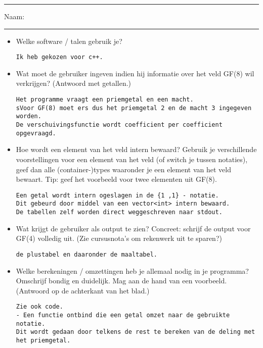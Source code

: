 \documentclass[11pt]{article}
\begin{document}
\begin{center}
\vspace{-4mm}{Discr Wisk \hfill\bf Eindige velden: vorderingen programmeeroefening \hfill 20 febr 2014}
\end{center}
\hrule
Naam: \\\phantom{x}
\hrule

\begin{itemize}
\item Welke software / talen gebruik je?
\begin{Verbatim}[frame=single]
Ik heb gekozen voor c++.
\end{Verbatim}

\item Wat moet de gebruiker ingeven indien hij informatie over het veld GF(8) wil verkrijgen? (Antwoord met getallen.)
\begin{Verbatim}[frame=single]
Het programme vraagt een priemgetal en een macht. 
sVoor GF(8) moet ers dus het priemgetal 2 en de macht 3 ingegeven worden.
De verschuivingsfunctie wordt coefficient per coefficient opgevraagd.
\end{Verbatim}

\item Hoe wordt een element van het veld intern bewaard? Gebruik je verschillende voorstellingen voor een element van het veld (of switch je tussen notaties), 
geef dan alle (container-)types waaronder je een element van het veld bewaart. Tip: geef het voorbeeld voor twee elementen uit GF(8). 
\begin{Verbatim}[frame=single]
Een getal wordt intern ogeslagen in de {1 ,1} - notatie.
Dit gebeurd door middel van een vector<int> intern bewaard.
De tabellen zelf worden direct weggeschreven naar stdout.
\end{Verbatim}

\item Wat krijgt de gebruiker als output te zien? Concreet: schrijf de output voor GF(4) volledig uit. (Zie cursusnota's om rekenwerk uit te sparen?)
\begin{Verbatim}[frame=single]
de plustabel en daaronder de maaltabel.

\end{Verbatim}

\item Welke berekeningen / omzettingen heb je allemaal nodig in je programma? Omschrijf bondig en duidelijk. Mag aan de hand van een voorbeeld.
(Antwoord op de achterkant van het blad.)

\begin{Verbatim}[frame=single]
Zie ook code.
- Een functie ontbind die een getal omzet naar de gebruikte notatie.
Dit wordt gedaan door telkens de rest te bereken van de deling met het priemgetal.


\end{Verbatim}
\end{itemize}
\end{document}
